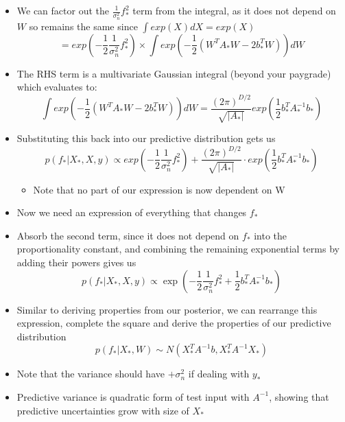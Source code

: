 \documentclass[12pt]{article}
\begin{document}
\begin{itemize}
\begin{equation}
\end{equation}
    \item We can factor out the $\frac{1}{\sigma_n^2}f_*^2$ term from the integral, as it does not depend on $W$ so remains the same since $\int exp(X) dX = exp(X)$ 
\begin{equation}
    = exp\left(-\frac{1}{2}\frac{1}{\sigma_n^2}f_*^2\right) \times \int exp\left(-\frac{1}{2}\left(W^TA_*W - 2b_*^TW\right)\right) dW
\end{equation}
    \item The RHS term is a multivariate Gaussian integral (beyond your paygrade) which evaluates to:
\begin{equation}
    \int exp\left(-\frac{1}{2} \left( W^TA_*W - 2b_*^TW \right) \right) dW = \frac{(2\pi)^{D/2}} {\sqrt{|A_*|}} exp\left( \frac{1}{2} b_*^TA_*^{-1}b_* \right)
\end{equation}
    \item Substituting this back into our predictive distribution gets us
\begin{equation}
    p(f_*|X_*,X,y) \propto exp\left(-\frac{1}{2}\frac{1}{\sigma_n^2}f_*^2\right) + \frac{(2\pi)^{D/2}}{\sqrt{|A_*|}} \cdot exp\left(\frac{1}{2}b_*^TA_*^{-1}b_*\right)  
\end{equation}
    \begin{itemize}
        \item Note that no part of our expression is now dependent on W
    \end{itemize}
    \item Now we need an expression of everything that changes $f_*$
    \item Absorb the second term, since it does not depend on $f_*$ into the proportionality constant, and combining the remaining exponential terms by adding their powers gives us
\begin{equation}
    p(f_*|X_*,X,y) \propto \exp\left(-\frac{1}{2}\frac{1}{\sigma_n^2}f_*^2 + \frac{1}{2}b_*^TA_*^{-1}b_*\right)
\end{equation}
    \item Similar to deriving properties from our posterior, we can rearrange this expression, complete the square and derive the properties of our predictive distribution
\begin{equation}
    p(f_*|X_*,W) \sim N(X_*^TA^{-1}b, X_*^TA^{-1}X_*)
\end{equation}
    \item Note that the variance should have $+ \sigma_n^2$ if dealing with $y_*$
    \item Predictive variance is quadratic form of test input with $A^{-1}$, showing that predictive uncertainties grow with size of $X_*$
\end{itemize}
\end{document}

